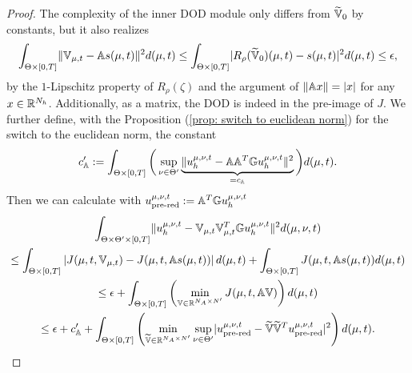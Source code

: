 \begin{proof}
    The complexity of the inner DOD module only differs from $\widetilde{\mathbb{V}}_0$ by constants, but it also realizes
    \begin{equation*}
        \int_{\Theta \times [0, T]} \lVert \mathbb{V}_{\mu, t} - \mathbb{A} s(\mu, t) \rVert^2 d(\mu, t)
        \leq \int_{\Theta \times [0, T]} \lvert R_\rho(\widetilde{\mathbb{V}}_0)(\mu, t) - s(\mu, t) \rvert^2
        d(\mu, t)
        \leq \epsilon,
    \end{equation*}
    by the $1$-Lipschitz property of $R_\rho(\zeta)$ and the argument of $\lVert \mathbb{A} x \rVert = \lvert x \rvert$
    for any $x \in \mathbb{R}^{N_h}$.
    Additionally, as a matrix, the DOD is indeed in the pre-image of $J$. We further define, with
    the Proposition (\ref{prop: switch to euclidean norm}) for the switch to the euclidean norm,
    the constant
    \begin{equation*}
        c_{\mathbb{A}}' := \int_{\Theta \times [0, T]} \bigg( \sup\limits_{\nu \in \Theta'} 
        \underbrace{\lVert u_h^{\mu, \nu, t} - \mathbb{A} \mathbb{A}^T \mathbb{G} u_h^{\mu, \nu, t} \rVert^2}_{= c_{\mathbb{A}}} \bigg) d(\mu,t).
    \end{equation*} 
    Then we can calculate with $u_\text{pre-red}^{\mu, \nu, t} := \mathbb{A}^T \mathbb{G} u_h^{\mu, \nu, t}$
    \begin{multline} \label{eq: last step for optimal DOD}
        \int_{\Theta \times \Theta' \times [0, T]} 
        \lVert u_h^{\mu, \nu, t} - \mathbb{V}_{\mu, t} \mathbb{V}_{\mu, t}^T \mathbb{G} u_h^{\mu, \nu, t} \rVert^2 d(\mu, \nu, t) \\ 
        \leq \int_{\Theta \times [0, T]}
        \left\vert J(\mu, t, \mathbb{V}_{\mu, t}) - J(\mu, t, \mathbb{A} s(\mu, t)) \right\vert d(\mu, t) +
        \int_{\Theta \times [0, T]} J(\mu, t, \mathbb{A} s(\mu, t)) d(\mu, t) \\
        \leq \epsilon + \int_{\Theta \times [0, T]} \left( \min\limits_{\mathbb{V} \in \mathbb{R}^{N_A \times N'}} J(\mu, t, \mathbb{A} \mathbb{V})\right) 
        d(\mu, t) \\
        \leq \epsilon + c_{\mathbb{A}}' + \int_{\Theta \times [0, T]} \left( \min\limits_{\widetilde{\mathbb{V}} \in \mathbb{R}^{N_A \times N'}} 
        \sup\limits_{\nu \in \Theta'} \lvert u_\text{pre-red}^{\mu, \nu, t} - \widetilde{\mathbb{V}} \widetilde{\mathbb{V}}^T u_\text{pre-red}^{\mu, \nu, t} \rvert^2 \right) d(\mu, t).
    \end{multline}
\end{proof}

